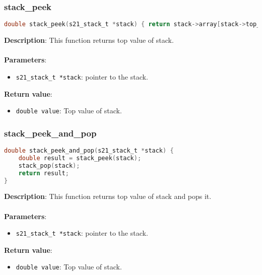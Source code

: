 \documentclass{article}
\begin{document}
\subsubsection{stack\_peek}
\begin{lstlisting}[language=C]
double stack_peek(s21_stack_t *stack) { return stack->array[stack->top_index]; }
\end{lstlisting}
\noindent
\textbf{Description}: This function returns top value of stack.\\\\
\textbf{Parameters}:
\begin{itemize}
    \item \texttt{s21\_stack\_t *stack}: pointer to the stack.
\end{itemize}
\textbf{Return value}:
\begin{itemize}
    \item \texttt{double value}: Top value of stack.
\end{itemize}

\subsubsection{stack\_peek\_and\_pop}
\begin{lstlisting}[language=C]
double stack_peek_and_pop(s21_stack_t *stack) {
    double result = stack_peek(stack);
    stack_pop(stack);
    return result;
}
\end{lstlisting}
\noindent
\textbf{Description}: This function returns top value of stack and pops it.\\\\
\textbf{Parameters}:
\begin{itemize}
    \item \texttt{s21\_stack\_t *stack}: pointer to the stack.
\end{itemize}
\textbf{Return value}:
\begin{itemize}
    \item \texttt{double value}: Top value of stack.
\end{itemize}
\end{document}
